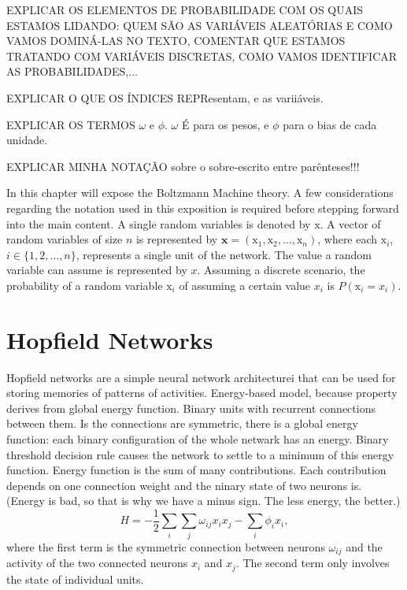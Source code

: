 EXPLICAR OS ELEMENTOS DE PROBABILIDADE COM OS QUAIS ESTAMOS LIDANDO:%
QUEM S\~{A}O AS VARI\'{A}VEIS ALEAT\'{O}RIAS E COMO VAMOS DOMIN\'{A}-LAS NO TEXTO,
COMENTAR QUE ESTAMOS TRATANDO COM VARI\'{A}VEIS DISCRETAS, COMO VAMOS IDENTIFICAR AS PROBABILIDADES,$\ldots$

EXPLICAR O QUE OS \'{I}NDICES REPResentam, e as varii\'{a}veis.

EXPLICAR OS TERMOS $\omega$ e $\phi$. $\omega$ \'{E} para os pesos, e $\phi$ para o bias de cada unidade.

EXPLICAR MINHA NOTA\c{C}\~{A}O sobre o sobre-escrito entre par\^{e}nteses!!!


In this chapter will expose the Boltzmann Machine theory. 
A few considerations regarding the notation used in this exposition is required before stepping forward into the main content. 
A single random variables is denoted by $\mathrm{x}$.
A vector of random variables of size $n$ is represented by $\mathrm{\mathbf{x}} = (\mathrm{x}_{1}, \mathrm{x}_{2}, \dots, \mathrm{x}_{n})$, where each $\mathrm{x}_{i}$, $i \in \{1, 2, \dots, n\}$, represents a single unit of the network. 
The value a random variable can assume is represented by $x$. 
Assuming a discrete scenario, the probability of a random variable $\mathrm{x}_{i}$ of assuming a certain value $x_{i}$ is $P(\mathrm{x}_{i} = x_{i})$. 

\section{Hopfield Networks}

Hopfield networks are a simple neural network architecturei that can be used for storing memories of patterns of activities.
Energy-based model, because property derives from global energy function.
Binary units with recurrent connections between them.
Is the connections are symmetric, there is a global energy function: each binary configuration of the whole netwark has an energy. Binary threshold decision rule causes the network to settle to a minimum of this energy function.
Energy function is the sum of many contributions. Each contribution depends on one connection weight and the ninary state of two neurons is. (Energy is bad, so that is why we have a minus sign. The less energy, the better.)
\begin{equation}\label{eq:hopfield-energy}
  H = -\frac{1}{2}\sum_{i} \sum_{j} \omega_{ij} x_{i} x_{j} - \sum_{i} \phi_{i} x_{i},
\end{equation}
where the first term is the symmetric connection between neurons $\omega_{ij}$ and the activity of the two connected neurons $x_{i}$ and $x_{j}$. The second term only involves the state of individual units.

